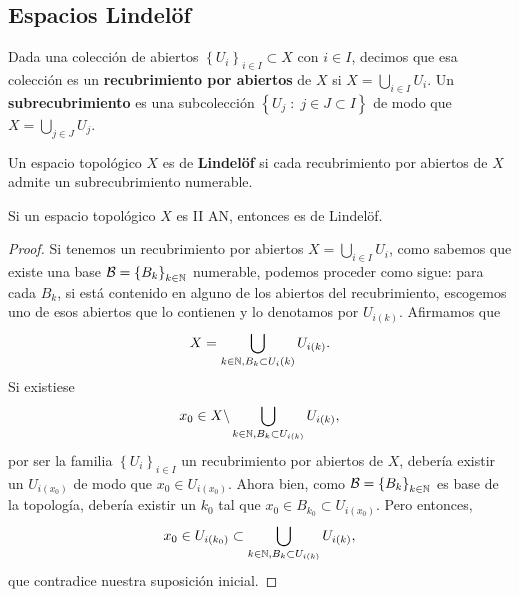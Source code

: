 \subsection{Espacios Lindelöf}
\begin{definition}
	Dada una colección de abiertos $\displaystyle \left\{ U_{i}\right\} _{i \in I}\subset X $ con $\displaystyle i \in I $, decimos que esa colección es un \textbf{recubrimiento por abiertos} de $\displaystyle X $ si $\displaystyle X = \bigcup_{i \in I}U_{i} $. Un \textbf{subrecubrimiento} es una subcolección $\displaystyle \left\{ U_{j} \; : \; j \in J \subset I\right\}  $ de modo que $\displaystyle X = \bigcup_{j \in J}U_{j} $.
\end{definition}
\begin{definition}
Un espacio topológico $\displaystyle X $ es de \textbf{Lindelöf} si cada recubrimiento por abiertos de $\displaystyle X $ admite un subrecubrimiento numerable.
\end{definition}
\begin{prop}
Si un espacio topológico $\displaystyle X $ es II AN, entonces es de Lindelöf. 
\end{prop}
\begin{proof}
	Si tenemos un recubrimiento por abiertos $\displaystyle X = \bigcup_{i \in I}U_{i} $, como sabemos que existe una base $\displaystyle \mathcal{B}= \left\{ B_{k}\right\} _{k\in \mathbb{N}} $ numerable, podemos proceder como sigue: para cada $\displaystyle B_{k} $, si está contenido en alguno de los abiertos del recubrimiento, escogemos uno de esos abiertos que lo contienen y lo denotamos por $\displaystyle U_{i\left(k\right)} $. Afirmamos que 
	\[X = \bigcup_{k \in \mathbb{N}, B_{k}\subset U_{i}\left(k\right)}U_{i\left(k\right)} .\]
	Si existiese 
	\[x_{0} \in X \backslash \bigcup_{k \in \mathbb{N}, B_{k}\subset U_{i\left(k\right)}}U_{i\left(k\right)} ,\]
	por ser la familia $\displaystyle \left\{ U_{i}\right\} _{i \in I} $ un recubrimiento por abiertos de $\displaystyle X $, debería existir un $\displaystyle U_{i\left(x_{0}\right)} $ de modo que $\displaystyle x_{0}\in U_{i\left(x_{0}\right)} $. Ahora bien, como $\displaystyle \mathcal{B}= \left\{ B_{k}\right\} _{k \in \mathbb{N}} $ es base de la topología, debería existir un $\displaystyle k_{0} $ tal que $\displaystyle x_{0}\in B_{k_{0}}\subset U_{i\left(x_{0}\right)} $. Pero entonces,
	\[x_{0}\in U_{i\left(k_{0}\right)}\subset \bigcup_{k \in \mathbb{N}, B_{k}\subset U_{i\left(k\right)}}U_{i\left(k\right)} ,\]
	que contradice nuestra suposición inicial.
\end{proof}
